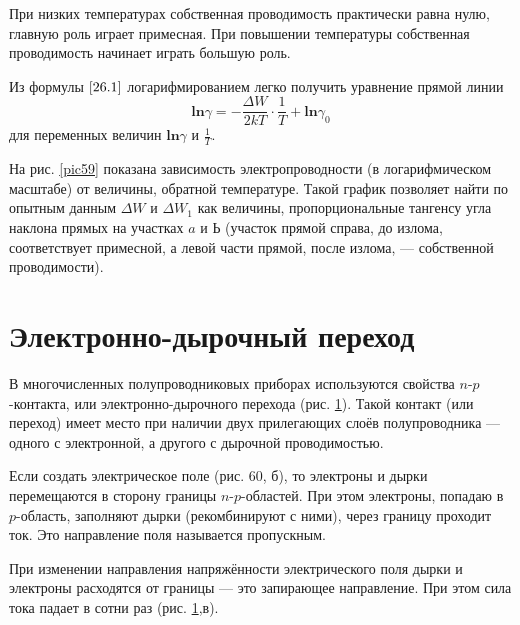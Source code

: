 \documentclass[a4paper,10pt]{book}
\begin{document}
При низких температурах собственная проводимость практически равна нулю, главную роль играет примесная. При повышении температуры собственная проводимость начинает играть большую роль.

Из формулы $\ref{26.1}$ логарифмированием легко получить уравнение прямой линии 
\begin{equation*}
\mathbf{ln}\gamma = - \frac{\Delta W}{2kT} \cdot \frac{1}{T} + \mathbf{ln}\gamma_0
\end{equation*}для переменных величин $\mathbf{ln}\gamma$ и $\frac{1}{T}$.

На рис. \ref{pic59} показана зависимость электропроводности (в логарифмическом масштабе) от величины, обратной температуре. Такой график позволяет найти по опытным данным $\Delta W$ и $\Delta W_1$ как величины, пропорциональные тангенсу угла наклона прямых на участках $a$ и $Ь$ (участок прямой справа, до излома, соответствует примесной, а левой части прямой, после излома, — собственной проводимости).

\section{Электронно-дырочный переход}

В многочисленных полупроводниковых приборах используются свойства $n$-$p$-контакта, или электронно-дырочного перехода (рис. \ref{pic60}). Такой контакт (или переход) имеет место при наличии двух прилегающих слоёв полупроводника — одного с электронной, а другого с дырочной проводимостью.

Если создать электрическое поле (рис. 60, $\textit{б}$), то электроны и дырки перемещаются в сторону границы $n$-$p$-областей. При этом электроны, попадаю в $p$-область, заполняют дырки (рекомбинируют с ними), через границу проходит ток. Это направление поля называется пропускным.

При изменении направления напряжённости электрического поля дырки и электроны расходятся от границы — это запирающее направление. При этом сила тока падает в сотни раз (рис. \ref{pic60},$\textit{в}$).

\begin{figure}[h]
	\caption{}
	\label{pic60}
\end{figure}
\end{document}
